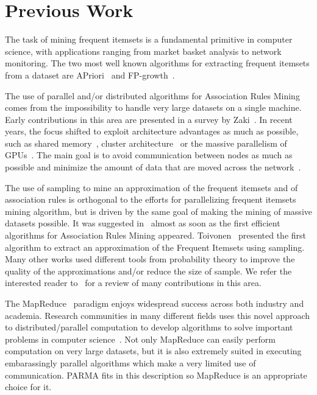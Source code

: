 \section{Previous Work}
\label{sec:related}

The task of mining frequent itemsets is a fundamental primitive in computer
science, with applications ranging from market basket analysis to network
monitoring. The two most well known algorithms for extracting frequent itemsets
from a dataset are APriori~\cite{AgrawalS94} and FP-growth~\cite{HanPY00}.

The use of parallel and/or distributed algorithms for Association Rules Mining comes from the
impossibility to handle very large datasets on a single machine. Early
contributions in this area are presented in a survey by Zaki~\cite{Zaki99}.
In recent years, the focus shifted to exploit architecture advantages as much as
possible, such as shared memory~\cite{JinYA05}, cluster
architecture~\cite{BuehrerPTKS07} or the massive parallelism of
GPUs~\cite{FangEtAl08}. The main goal is to avoid communication
between nodes as much as possible and minimize the amount of data that are moved
across the 
network~\cite{CongHHP05,EHZaiane06,LiuLZT07,OzkuralUA11}.

The use of sampling to mine an approximation of the frequent itemsets and of
association rules is orthogonal to the efforts for parallelizing frequent
itemsets mining algorithm, but is driven by the same goal of making the mining
of massive datasets possible. It was suggested in~\cite{MannilaTV94} almost as soon as the
first efficient algorithms for Association Rules Mining appeared.
Toivonen~\cite{Toivonen96} presented the first algorithm to extract an
approximation of the Frequent Itemsets using sampling. Many other works used different tools
from probability theory to improve the quality of the approximations and/or
reduce the size of sample. We refer the interested reader
to~\cite{RiondatoU11} for a review of many contributions in this area.

The MapReduce~\cite{DeanG08} paradigm enjoys widespread success
across both industry and academia. Research communities in many different
fields uses this novel approach to distributed/parallel computation to develop
algorithms to solve important problems in computer
science~\cite{ChierichettiKT10,ChuKLYBNO06,GoodrichSZ11,LinS10,PietracaprinaPRSU11}.
Not only MapReduce can easily perform computation on very large datasets, but it
is also extremely suited in executing embarassingly parallel algorithms which
make a very limited use of communication. PARMA fits in this description so
MapReduce is an appropriate choice for it.

